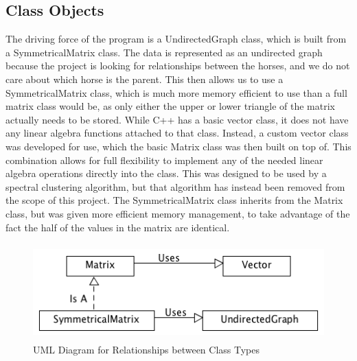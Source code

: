 \documentclass[12pt]{article}
\begin{document}
\subsection{Class Objects}
The driving force of the program is a UndirectedGraph class, which is built from a SymmetricalMatrix class. The data is represented as an undirected graph because the project is looking for relationships between the horses, and we do not care about which horse is the parent. This then allows us to use a SymmetricalMatrix class, which is much more memory efficient to use than a full matrix class would be, as only either the upper or lower triangle of the matrix actually needs to be stored.
\newline\newline
While C++ has a basic vector class, it does not have any linear algebra functions attached to that class. Instead, a custom vector class was developed for use, which the basic Matrix class was then built on top of. This combination allows for full flexibility to implement any of the needed linear algebra operations directly into the class. This was designed to be used by a spectral clustering algorithm, but that algorithm has instead been removed from the scope of this project. The SymmetricalMatrix class inherits from the Matrix class, but was given more efficient memory management, to take advantage of the fact the half of the values in the matrix are identical.
\newline\newline

\begin{figure}[!htb]
\begin{center}
	\includegraphics[height=10em]{uml.png}
	\caption{UML Diagram for Relationships between Class Types}
	\label{uml}
\end{center}
\end{figure}
\end{document}
